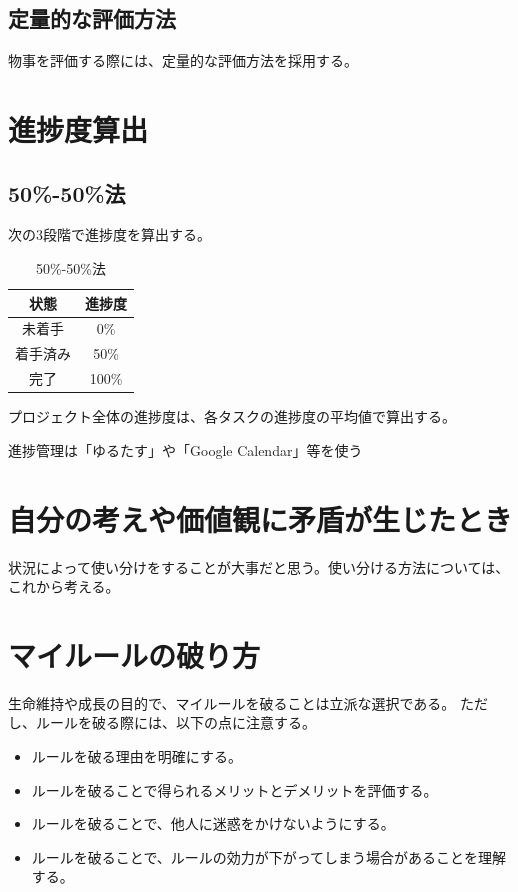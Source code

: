 \documentclass[dvipdfmx]{jlreq}
\begin{document}
    \subsection{定量的な評価方法}
        物事を評価する際には、定量的な評価方法を採用する。

\section{進捗度算出}
    \subsection{50\%-50\%法}
        次の3段階で進捗度を算出する。
        \begin{table}[ht]
            \centering
            \begin{tabular}{|c|c|}
                \hline
                状態 & 進捗度 \\
                \hline
                未着手 & 0\% \\
                \hline
                着手済み & 50\% \\
                \hline
                完了 & 100\% \\
                \hline
            \end{tabular}
            \caption{50\%-50\%法}
        \end{table}
        プロジェクト全体の進捗度は、各タスクの進捗度の平均値で算出する。

        進捗管理は「ゆるたす」や「Google Calendar」等を使う

\section{自分の考えや価値観に矛盾が生じたとき}
    状況によって使い分けをすることが大事だと思う。使い分ける方法については、これから考える。

\section{マイルールの破り方}
    生命維持や成長の目的で、マイルールを破ることは立派な選択である。
    ただし、ルールを破る際には、以下の点に注意する。
    \begin{itemize}
        \item ルールを破る理由を明確にする。
        \item ルールを破ることで得られるメリットとデメリットを評価する。
        \item ルールを破ることで、他人に迷惑をかけないようにする。
        \item ルールを破ることで、ルールの効力が下がってしまう場合があることを理解する。
    \end{itemize}
    
\end{document}
